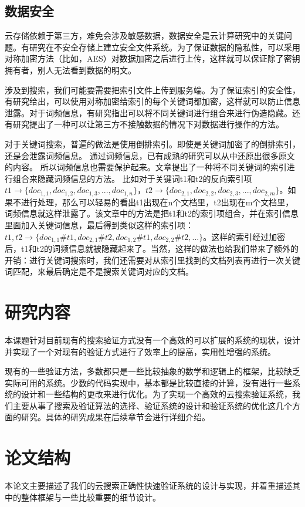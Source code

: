 \subsection{数据安全}
云存储依赖于第三方，难免会涉及敏感数据，数据安全是云计算研究中的关键问题。有研究在不安全存储上建立安全文件系统。为了保证数据的隐私性，可以采用对称加密方法（比如，AES）对数据加密之后进行上传，这样就可以保证除了密钥拥有者，别人无法看到数据的明文。

涉及到搜索，我们可能要需要把索引文件上传到服务端。为了保证索引的安全性，有研究给出，可以使用对称加密给索引的每个关键词都加密，这样就可以防止信息泄露。对于词频信息，有研究指出可以将不同关键词进行组合来进行伪造隐藏。还有研究提出了一种可以让第三方不接触数据的情况下对数据进行操作的方法。

对于关键词搜索，普遍的做法是使用倒排索引。即使是关键词加密了的倒排索引，还是会泄露词频信息。
通过词频信息，已有成熟的研究可以从中还原出很多原文的内容。
所以词频信息也需要保护起来。文章\cite{zerr2008zerber}提出了一种将不同关键词的索引进行组合来隐藏词频信息的方法。
比如对于关键词t1和t2的反向索引项$t1 \to \{doc_{1,1},doc_{1,2},doc_{1,3},...,doc_{1,n}\}$，$t2 \to \{doc_{2,1},doc_{2,2},doc_{2,3},...,doc_{2,m}\}$。如果不进行处理，那么可以轻易的看出t1出现在n个文档里，t2出现在m个文档里，词频信息就这样泄露了。该文章中的方法是把t1和t2的索引项组合，并在索引信息里面加入关键词信息，最后得到类似这样的索引项：$t1,t2 \to \{doc_{1,1}\#t1,doc_{2,1}\#t2,doc_{1,2}\#t1,doc_{2,2}\#t2,...\}$。这样的索引经过加密后，t1和t2的词频信息就被隐藏起来了。当然，这样的做法也给我们带来了额外的开销：进行关键词搜索时，我们还需要对从索引里找到的文档列表再进行一次关键词匹配，来最后确定是不是搜索关键词对应的文档。

\section{研究内容}
本课题针对目前现有的搜索验证方式没有一个高效的可以扩展的系统的现状，设计并实现了一个对现有的验证方式进行了效率上的提高，实用性增强的系统。

现有的一些验证方法，多数都只是一些比较抽象的数学和逻辑上的框架，比较缺乏实际可用的系统。少数的代码实现中，基本都是比较直接的计算，没有进行一些系统的设计和一些结构的更改来进行优化。为了实现一个高效的云搜索验证系统，我们主要从事了搜索及验证算法的选择、验证系统的设计和验证系统的优化这几个方面的研究。具体的研究成果在后续章节会进行详细介绍。

\section{论文结构}
本论文主要描述了我们的云搜索正确性快速验证系统的设计与实现，并着重描述其中的整体框架与一些比较重要的细节设计。


